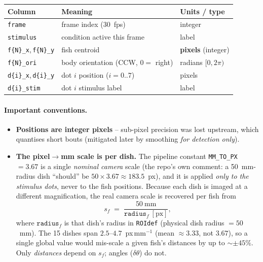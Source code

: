 \documentclass{article}
\begin{document}
\begin{table}[h]\centering\small
\begin{tabular}{@{}lll@{}}
\toprule
\textbf{Column} & \textbf{Meaning} & \textbf{Units / type}\\
\midrule
\texttt{frame}            & frame index (30~fps)                 & integer\\
\texttt{stimulus}         & condition active this frame          & label\\
\texttt{f\{N\}\_x},\,\texttt{f\{N\}\_y} & fish centroid              & \textbf{pixels} (integer)\\
\texttt{f\{N\}\_ori}      & body orientation (CCW, $0=$ right)   & radians $[0,2\pi)$\\
\texttt{d\{i\}\_x},\,\texttt{d\{i\}\_y} & dot $i$ position ($i=0..7$) & pixels\\
\texttt{d\{i\}\_stim}     & dot $i$ stimulus label               & label\\
\bottomrule
\end{tabular}
\end{table}

\paragraph{Important conventions.}
\begin{itemize}
  \item \textbf{Positions are integer pixels} -- sub-pixel precision was lost
        upstream, which quantises short bouts (mitigated later by smoothing
        \emph{for detection only}).
  \item \textbf{The pixel$\to$mm scale is per dish.} The pipeline constant
        \texttt{MM\_TO\_PX}$=3.67$ is a single \emph{nominal camera} scale (the
        repo's own comment: a 50~mm-radius dish ``should'' be
        $50\times3.67\approx183.5$~px), and it is applied \emph{only to the
        stimulus dots}, never to the fish positions. Because each dish is imaged
        at a different magnification, the real camera scale is recovered per fish
        from
        \[ s_f \;=\; \frac{50~\text{mm}}{\texttt{radius}_f~[\text{px}]}, \]
        where $\texttt{radius}_f$ is that dish's radius in \texttt{ROIdef}
        (physical dish radius $=50$~mm). The 15 dishes span
        $2.5$--$4.7$~px\,mm$^{-1}$ (mean $\approx 3.33$, not $3.67$), so a single
        global value would mis-scale a given fish's distances by up to
        $\sim\pm45\%$. Only \emph{distances} depend on $s_f$; angles
        ($\delta\theta$) do not.
\end{itemize}
\end{document}
